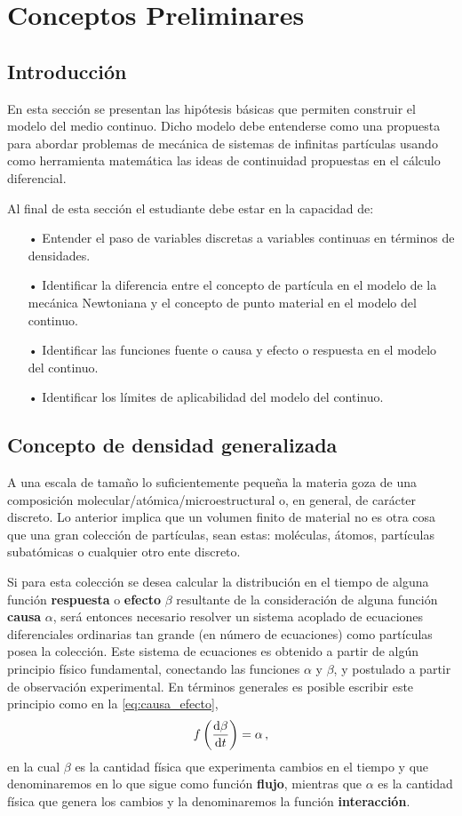\documentclass[../notas medios.tex]{subfiles}
\begin{document}
\chapter{Conceptos Preliminares}

\graphicspath{{img/introduccion/}}

\section{Introducción}
En esta sección se presentan las hipótesis básicas que permiten construir el 
modelo del medio continuo. Dicho modelo debe entenderse como una propuesta  
para abordar problemas de mecánica de sistemas de infinitas partículas usando 
como herramienta matemática las ideas de continuidad propuestas en 
el cálculo diferencial.

Al final de esta sección el estudiante debe estar en la capacidad de:
\begin{itemize}
\item[•] Entender el paso de variables discretas a variables continuas en términos de densidades.
\item[•] Identificar la diferencia entre el concepto de partícula en el modelo de la mecánica Newtoniana y el concepto de punto material en el modelo del continuo.
\item[•] Identificar las funciones fuente o causa y efecto o respuesta en el modelo del continuo.
\item[•] Identificar los límites de aplicabilidad del modelo del continuo.
\end{itemize}

\section{Concepto de densidad generalizada}
A una escala de tamaño lo suficientemente pequeña la materia goza de una 
composición molecular/atómica/microestructural o, en general, de carácter 
discreto. Lo anterior implica que un volumen finito de material no es otra cosa 
que una gran colección de partículas, sean estas: moléculas, átomos, partículas 
subatómicas o cualquier otro ente discreto.

Si para esta colección se desea calcular la distribución en el tiempo de alguna 
función {\bf respuesta} o {\bf efecto} $\beta$ resultante de la consideración 
de alguna función {\bf causa} $\alpha$, será entonces necesario resolver un 
sistema acoplado de ecuaciones diferenciales ordinarias tan grande (en número 
de ecuaciones) como partículas posea la colección. Este sistema de ecuaciones 
es obtenido a partir de algún principio físico fundamental, conectando las 
funciones $\alpha$ y $\beta$, y postulado a partir de observación experimental. 
En términos generales es posible escribir este principio como en la 
\cref{eq:causa_efecto},
\begin{equation}
f\left(\dv{\beta}{t}\right) = \alpha\, ,
\label{eq:causa_efecto}
\end{equation}
en la cual $\beta$ es la cantidad física que experimenta cambios en el
tiempo y que denominaremos en lo que sigue como función {\bf flujo}, mientras 
que $\alpha$ es la cantidad física que genera los cambios y la denominaremos la 
función {\bf interacción}. 
\end{document}
